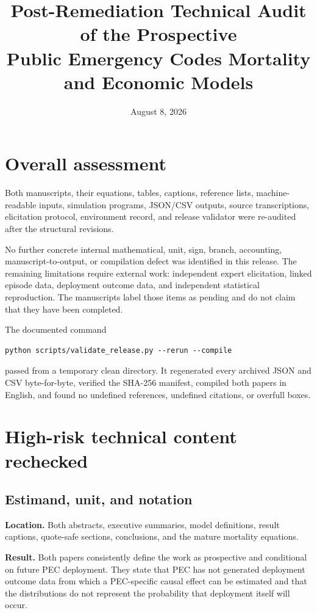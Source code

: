 \documentclass[10pt]{article}
\title{Post-Remediation Technical Audit of the Prospective\\
Public Emergency Codes Mortality and Economic Models}
\author{}
\date{August 8, 2026}
\begin{document}
\maketitle

\section*{Overall assessment}

Both manuscripts, their equations, tables, captions, reference lists,
machine-readable inputs, simulation programs, JSON/CSV outputs, source
transcriptions, elicitation protocol, environment record, and release validator
were re-audited after the structural revisions.

No further concrete internal mathematical, unit, sign, branch, accounting,
manuscript-to-output, or compilation defect was identified in this release.  The
remaining limitations require external work: independent expert elicitation,
linked episode data, deployment outcome data, and independent statistical
reproduction.  The manuscripts label those items as
pending and do not claim that they have been completed.

The documented command
\begin{verbatim}
python scripts/validate_release.py --rerun --compile
\end{verbatim}
passed from a temporary clean directory.  It regenerated every archived JSON
and CSV byte-for-byte, verified the SHA-256 manifest, compiled both papers in
English, and found no undefined references, undefined citations, or overfull
boxes.

\section*{High-risk technical content rechecked}

\subsection*{Estimand, unit, and notation}

\textbf{Location.} Both abstracts, executive summaries, model definitions,
result captions, quote-safe sections, conclusions, and the mature mortality
equations.

\textbf{Result.} Both papers consistently define the work as prospective and
conditional on future PEC deployment.  They state that PEC has not generated
deployment outcome data from which a PEC-specific causal effect can be
estimated and that the distributions do not represent the probability that
deployment itself will occur.
\end{document}
